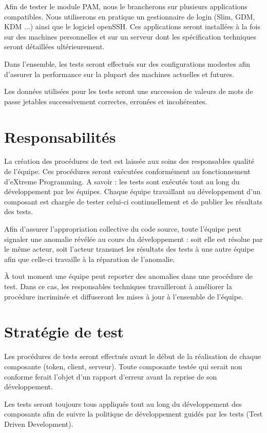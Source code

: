 \documentclass{"../../res/univ-projet"}
\begin{document}
  Afin de tester le module PAM, nous le brancherons sur plusieurs applications compatibles. Nous 
utiliserons en pratique un gestionnaire de login (Slim, GDM, KDM ...) ainsi que le logiciel openSSH.
Ces applications seront installées à la fois sur des machines personnelles et sur un serveur dont les 
spécification techniques seront détaillées ultérieurement.
  
  Dans l'ensemble, les tests seront effectués sur des configurations modestes afin d'assurer la performance sur la plupart des machines actuelles et futures.
  
  Les données utilisées pour les tests seront une succession de valeurs de mots de passe jetables successivement correctes, erronées et incohérentes.
  
  \section{Responsabilités}
  La création des procédures de test est laissée aux soins des responsables qualité de l'équipe. Ces procédures seront exécutées conformément au fonctionnement d'eXtreme Programming. A savoir : les tests sont exécutés tout au long du développement par les équipes. Chaque équipe travaillant au développement d'un composant est chargée de tester celui-ci continuellement et de publier les résultats des tests.
  
  Afin d'assurer l'appropriation collective du code source, toute l'équipe peut signaler une anomalie révélée au cours du développement : soit elle est résolue par le même acteur, soit l'acteur transmet les résultats 
des tests à une autre équipe afin que celle-ci travaille à la réparation de l'anomalie.
  
  À tout moment une équipe peut reporter des anomalies dans une procédure de test. Dans ce cas, les responsables techniques travailleront à améliorer la procédure incriminée et diffuseront les mises à jour à l'ensemble de l'équipe.
  
  \section{Stratégie de test}
  Les procédures de tests seront effectués avant le début de la réalisation de chaque composante (token, client, serveur). Toute composante testée qui serait non conforme ferait l'objet d'un 
  rapport d'erreur avant la reprise de son développement.
  
  Les tests seront toujours tous appliqués tout au long du développement des composants afin de suivre la politique de développement guidés par les tests (Test Driven Development).
    
\end{document}
